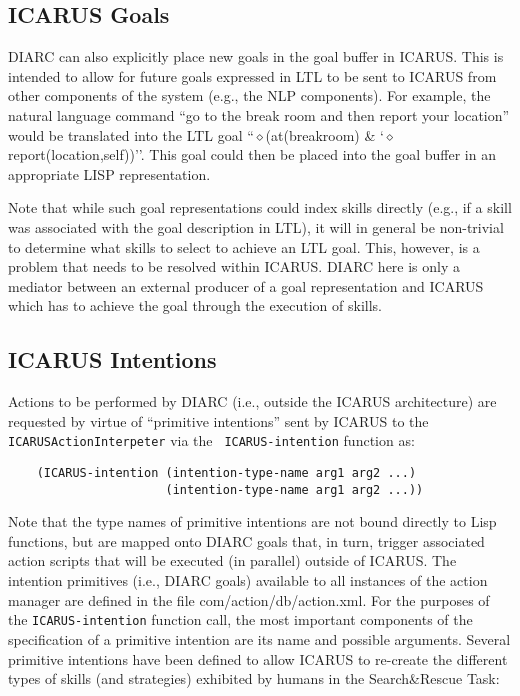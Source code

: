 \documentclass{article}
\begin{document}
\subsection*{ICARUS Goals}

DIARC can also explicitly place new goals in the goal buffer in
ICARUS.  This is intended to allow for future goals expressed in LTL
to be sent to ICARUS from other components of the system (e.g., the
NLP components).  For example, the natural language command ``go to
the break room and then report your location'' would be translated
into the LTL goal ``$\diamond$(at(breakroom) \&
`$\diamond$report(location,self))''.  This goal could then be placed
into the goal buffer in an appropriate LISP representation.

Note that while such goal representations could index skills directly
(e.g., if a skill was associated with the goal description in LTL), it
will in general be non-trivial to determine what skills to select to
achieve an LTL goal.  This, however, is a problem that needs to be
resolved within ICARUS.  DIARC here is only a mediator between an
external producer of a goal representation and ICARUS which has to
achieve the goal through the execution of skills.

\subsection*{ICARUS Intentions}

Actions to be performed by DIARC (i.e., outside the ICARUS
architecture) are requested by virtue of ``primitive intentions'' sent
by ICARUS to the {\tt ICARUSActionInterpeter} via the {\tt
  ICARUS-intention} function as:

\begin{verbatim}
    (ICARUS-intention (intention-type-name arg1 arg2 ...)
                      (intention-type-name arg1 arg2 ...))
\end{verbatim}

\noindent Note that the type names of primitive intentions are not
bound directly to Lisp functions, but are mapped onto DIARC goals
that, in turn, trigger associated action scripts that will be executed
(in parallel) outside of ICARUS.  The intention primitives (i.e.,
DIARC goals) available to all instances of the action manager are
defined in the file {\sc com/action/db/action.xml}.  For the purposes
of the {\tt ICARUS-intention} function call, the most important
components of the specification of a primitive intention are its name
and possible arguments.  Several primitive intentions have been
defined to allow ICARUS to re-create the different types of skills
(and strategies) exhibited by humans in the Search\&Rescue Task:
\end{document}
